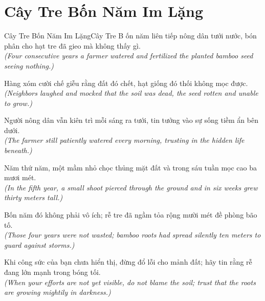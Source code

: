 \section{Cây Tre Bốn Năm Im Lặng}
\begin{truyen}{Cây Tre Bốn Năm Im Lặng}{Cây Tre}
B ốn năm liên tiếp nông dân tưới nước, bón phân cho hạt tre đã gieo mà không thấy gì.\\
\textit{(Four consecutive years a farmer watered and fertilized the planted bamboo seed seeing nothing.)}

Hàng xóm cười chế giễu rằng đất đó chết, hạt giống đó thối không mọc được.\\
\textit{(Neighbors laughed and mocked that the soil was dead, the seed rotten and unable to grow.)}

Người nông dân vẫn kiên trì mỗi sáng ra tưới, tin tưởng vào sự sống tiềm ẩn bên dưới.\\
\textit{(The farmer still patiently watered every morning, trusting in the hidden life beneath.)}

Năm thứ năm, một mầm nhỏ chọc thủng mặt đất và trong sáu tuần mọc cao ba mươi mét.\\
\textit{(In the fifth year, a small shoot pierced through the ground and in six weeks grew thirty meters tall.)}

Bốn năm đó không phải vô ích; rễ tre đã ngầm tỏa rộng mười mét đề phòng bão tố.\\
\textit{(Those four years were not wasted; bamboo roots had spread silently ten meters to guard against storms.)}

\end{truyen}
\begin{baihoc}
  Khi công sức của bạn chưa hiển thị, đừng đổ lỗi cho mảnh đất; hãy tin rằng rễ đang lớn mạnh trong bóng tối.\\
  \textit{(When your efforts are not yet visible, do not blame the soil; trust that the roots are growing mightily in darkness.)}
\end{baihoc}

